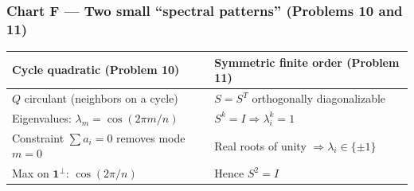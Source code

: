 \documentclass[12pt,a4paper]{article}
\theoremstyle{plain}
\theoremstyle{definition}      %
\begin{document}

\subsubsection*{Chart F — Two small “spectral patterns” (Problems 10 and 11)}

\begin{center}
	\renewcommand{\arraystretch}{1.25}
	\begin{tabular}{@{}p{7.0cm}p{6.5cm}@{}}
		\toprule
		\textbf{Cycle quadratic (Problem 10)} & \textbf{Symmetric finite order (Problem 11)}\\
		\midrule
		$Q$ circulant (neighbors on a cycle) &
		$S=S^T$ orthogonally diagonalizable\\
		Eigenvalues: $\lambda_m=\cos(2\pi m/n)$ &
		$S^k=I \Rightarrow \lambda_i^k=1$\\
		Constraint $\sum a_i=0$ removes mode $m=0$ &
		Real roots of unity $\Rightarrow \lambda_i\in\{\pm 1\}$\\
		Max on $\mathbf 1^\perp$: $\cos(2\pi/n)$ &
		Hence $S^2=I$\\
		\bottomrule
	\end{tabular}
\end{center}

	
\end{document}
